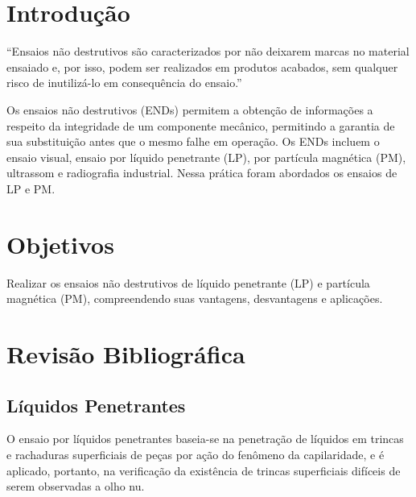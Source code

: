 \documentclass[12pt,oneside]{article}
\begin{document}
\frenchspacing
\hypersetup{pageanchor=false}




\listoffigures
\thispagestyle{empty}
\clearpage
\tableofcontents
\thispagestyle{empty}
\setcounter{page}{0}

\clearpage
\hypersetup{pageanchor=true}

\section{Introdução}
``Ensaios não destrutivos são caracterizados por não deixarem marcas no material
ensaiado e, por isso, podem ser realizados em produtos acabados, sem qualquer
risco de inutilizá-lo em consequência do ensaio.'' \cite{marinho2009}

Os ensaios não destrutivos (ENDs) permitem a obtenção de informações a respeito
da integridade de um componente mecânico, permitindo a garantia de sua
substituição antes que o mesmo falhe em operação.
Os ENDs incluem o ensaio visual, ensaio por líquido penetrante (LP), por
partícula magnética (PM), ultrassom e radiografia industrial. Nessa prática
foram abordados os ensaios de LP e PM.

\section{Objetivos}

Realizar os ensaios não destrutivos de líquido penetrante (LP) e partícula
magnética (PM), compreendendo suas vantagens, desvantagens e aplicações.

\section{Revisão Bibliográfica}

\subsection{Líquidos Penetrantes}
\label{sub:lp}

O ensaio por líquidos penetrantes baseia-se na penetração de líquidos
em trincas e rachaduras superficiais de peças por ação do fenômeno da
capilaridade, e é aplicado, portanto, na verificação da existência de
trincas superficiais difíceis de serem observadas a olho nu. \cite{garcia00}
\end{document}
